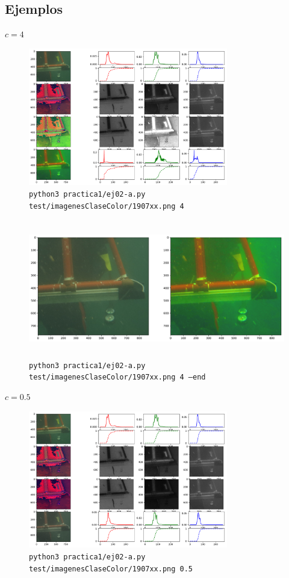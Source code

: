 \documentclass[11pt, spanish]{article}
\begin{document}
\subsection*{Ejemplos}
$c = 4$
\begin{figure}[H]
\centering
  \includegraphics[height=6cm]{informe-imgs/ej02-a-1.pdf}
  \caption{\texttt{python3 practica1/ej02-a.py test/imagenesClaseColor/1907xx.png 4}}
\end{figure}
\begin{figure}[H]
\centering
  \includegraphics[height=6cm]{informe-imgs/ej02-a-2.pdf}
  \caption{\texttt{python3 practica1/ej02-a.py test/imagenesClaseColor/1907xx.png 4 --end}}
\end{figure}

$c = 0.5$
\begin{figure}[H]
\centering
  \includegraphics[height=6cm]{informe-imgs/ej02-a-3.pdf}
  \caption{\texttt{python3 practica1/ej02-a.py test/imagenesClaseColor/1907xx.png 0.5}}
\end{figure}
\end{document}
